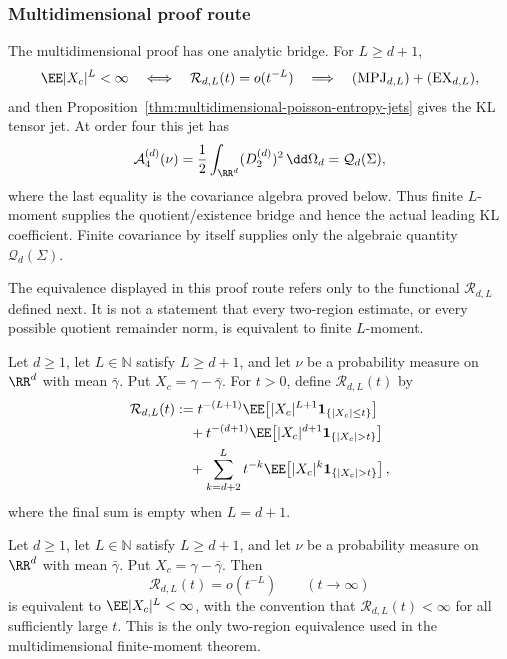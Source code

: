 \subsubsection*{Multidimensional proof route}\leavevmode\par\smallskip
The multidimensional proof has one analytic bridge.  For \(L\ge d+1\),
\[
\EE|X_c|^L<\infty
\quad\Longleftrightarrow\quad
\mathcal R_{d,L}(t)=o(t^{-L})
\quad\Longrightarrow\quad
(\mathrm{MPJ}_{d,L})+(\mathrm{EX}_{d,L}),
\]
and then Proposition~\ref{thm:multidimensional-poisson-entropy-jets} gives the
KL tensor jet.  At order four this jet has
\[
\mathcal A_4^{(d)}(\nu)
=\frac12\int_{\RR^d}(D_2^{(d)})^2\,\dd\Omega_d
=\mathcal Q_d(\Sigma),
\]
where the last equality is the covariance algebra proved below.  Thus finite
\(L\)-moment supplies the quotient/existence bridge and hence the actual
leading KL coefficient.  Finite covariance by itself supplies only the
algebraic quantity \(\mathcal Q_d(\Sigma)\).

The equivalence displayed in this proof route refers only to the functional
\(\mathcal R_{d,L}\) defined next.  It is not a statement that every
two-region estimate, or every possible quotient remainder norm, is equivalent
to finite \(L\)-moment.

\begin{definition}%
\label{def:two-region-remainder-functional}
Let \(d\ge1\), let \(L\in\mathbb N\) satisfy \(L\ge d+1\), and let \(\nu\) be
a probability measure on \(\RR^d\) with mean \(\bar{\gamma}\).  Put
\(X_c=\gamma-\bar{\gamma}\).  For \(t>0\), define \(\mathcal R_{d,L}(t)\) by
\begin{equation}\label{eq:conditional-multidim-two-region-tail}
\begin{aligned}
\mathcal R_{d,L}(t)
&:=t^{-(L+1)}\EE\!\left[
|X_c|^{L+1}{\bf1}_{\{|X_c|\le t\}}\right] \\
&\quad{}+ t^{-(d+1)}\EE\!\left[
|X_c|^{d+1}{\bf1}_{\{|X_c|>t\}}\right] \\
&\quad{}+ \sum_{k=d+2}^{L}t^{-k}\EE\!\left[
|X_c|^k{\bf1}_{\{|X_c|>t\}}\right],
\end{aligned}
\end{equation}
where the final sum is empty when \(L=d+1\).
\end{definition}

\begin{lemma}%
\label{lem:two-region-remainder-equivalent-finite-moment}
Let \(d\ge1\), let \(L\in\mathbb N\) satisfy \(L\ge d+1\), and let \(\nu\) be
a probability measure on \(\RR^d\) with mean \(\bar{\gamma}\).  Put
\(X_c=\gamma-\bar{\gamma}\).  Then
\[
\mathcal R_{d,L}(t)=o(t^{-L})
\qquad(t\to\infty)
\]
is equivalent to \(\EE|X_c|^L<\infty\), with the convention that
\(\mathcal R_{d,L}(t)<\infty\) for all sufficiently large \(t\).
This is the only two-region equivalence used in the multidimensional
finite-moment theorem.
\end{lemma}

